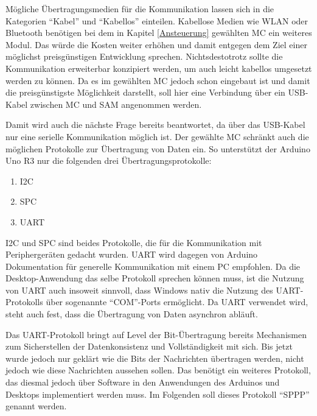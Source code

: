 Mögliche Übertragungsmedien für die Kommunikation lassen sich in die Kategorien \enquote{Kabel} und \enquote{Kabellos} einteilen.
Kabellose Medien wie WLAN oder Bluetooth benötigen bei dem in Kapitel \ref{Ansteuerung} gewählten \ac{MC} ein weiteres Modul.
Das würde die Kosten weiter erhöhen und damit entgegen dem Ziel einer möglichst preisgünstigen Entwicklung sprechen.
Nichtsdestotrotz sollte die Kommunikation erweiterbar konzipiert werden, um auch leicht kabellos umgesetzt werden zu können.
Da es im gewählten \ac{MC} jedoch schon eingebaut ist und damit die preisgünstigste Möglichkeit darstellt, soll hier eine Verbindung über ein USB-Kabel zwischen \ac{MC} und \ac{SAM} angenommen werden.

Damit wird auch die nächste Frage bereits beantwortet, da über das USB-Kabel nur eine serielle Kommunikation möglich ist.
Der gewählte \ac{MC} schränkt auch die möglichen Protokolle zur Übertragung von Daten ein.
So unterstützt der Arduino Uno R3 nur die folgenden drei Übertragungsprotokolle:
\begin{enumerate}
    \item \ac{I2C}
    \item \ac{SPC}
    \item \ac{UART}
\end{enumerate}
\ac{I2C} und \ac{SPC} sind beides Protokolle, die für die Kommunikation mit Periphergeräten gedacht wurden.
\ac{UART} wird dagegen von Arduino Dokumentation für generelle Kommunikation mit einem PC empfohlen. %
Da die Desktop-Anwendung das selbe Protokoll sprechen können muss, ist die Nutzung von \ac{UART} auch insoweit sinnvoll, dass Windows nativ die Nutzung des \ac{UART}-Protokolls über sogenannte \enquote{COM}-Ports ermöglicht.
Da \ac{UART} verwendet wird, steht auch fest, dass die Übertragung von Daten asynchron abläuft.

Das \ac{UART}-Protokoll bringt auf Level der Bit-Übertragung bereits Mechanismen zum Sicherstellen der Datenkonsistenz und Vollständigkeit mit sich. %
Bis jetzt wurde jedoch nur geklärt wie die Bits der Nachrichten übertragen werden, nicht jedoch wie diese Nachrichten aussehen sollen.
Das benötigt ein weiteres Protokoll, das diesmal jedoch über Software in den Anwendungen des Arduinos und Desktops implementiert werden muss.
Im Folgenden soll dieses Protokoll \enquote{\ac{SPPP}} genannt werden.

